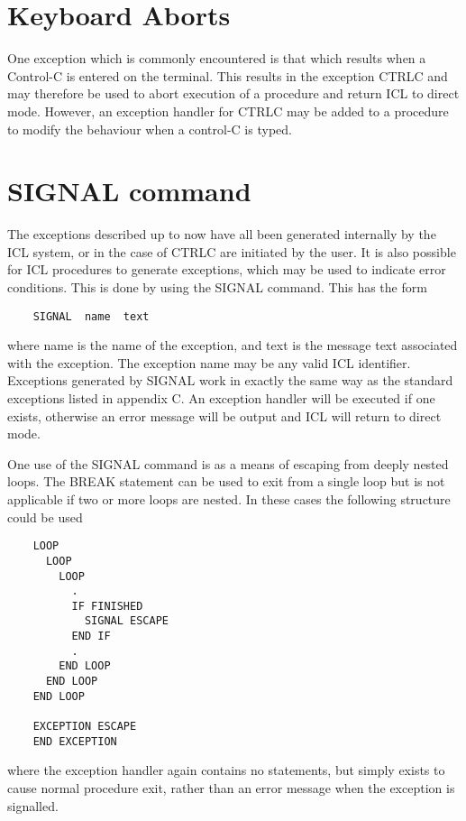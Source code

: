 \documentclass[twoside,11pt]{report}
\newcommand{\xlabel}[1]{}
\begin{document}
\section{\xlabel{keyboard_aborts}Keyboard Aborts}

One exception which is commonly encountered is that which results when
a Control-C is entered on the terminal. This results in the exception
CTRLC and may therefore be used to abort execution of a procedure and 
return ICL to direct mode. However, an exception handler for CTRLC may
be added to a procedure to modify the behaviour when a control-C is
typed.

\section{\xlabel{signal_command}SIGNAL command}

The exceptions described up to now have all been generated internally by the 
ICL system, or in the case of CTRLC are initiated by the user. It is also
possible for ICL procedures to generate exceptions, which may be used to
indicate error conditions. This is done by using the SIGNAL command. This
has the form
\begin{verbatim}
    SIGNAL  name  text
\end{verbatim}
where name is the name of the exception, and text is the message text 
associated with the exception. The exception name may be any valid ICL
identifier. Exceptions generated by SIGNAL work in exactly the same way
as the standard exceptions listed in appendix C. An exception handler
will be executed if one exists, otherwise an error message will be output
and ICL will return to direct mode.

One use of the SIGNAL command is as a means of escaping from deeply nested
loops. The BREAK statement can be used to exit from a single loop but is
not applicable if two or more loops are nested. In these cases the following
structure could be used
\begin{verbatim}
    LOOP
      LOOP
        LOOP
          .
          IF FINISHED
            SIGNAL ESCAPE
          END IF
          .
        END LOOP
      END LOOP
    END LOOP

    EXCEPTION ESCAPE
    END EXCEPTION
\end{verbatim}

where the exception handler again contains no statements, but simply exists
to cause normal procedure exit, rather than an error message when the 
exception is signalled.
\end{document}
